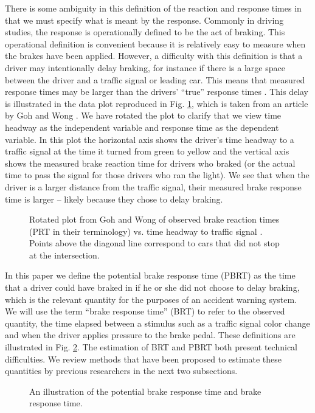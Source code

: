 \documentclass[conference]{IEEEtran}
\begin{document}
There is some ambiguity in this definition of the reaction and response times in that we must specify what is meant by the response.  Commonly in driving studies, the response is operationally defined to be the act of braking.
 This operational definition is convenient because it is relatively easy to measure when the brakes have been applied.  However, a difficulty with this definition is that a driver may intentionally delay braking, for instance if there is a large space between the driver and a traffic signal or leading car.  This means that measured response times may be larger than the drivers' ``true'' response times \cite{GohWong:DriverPRTDuringSignalChange}.
This delay is illustrated in the data plot reproduced in Fig. \ref{fig:GohWongRTPlot}, which is taken from an article by Goh and Wong \cite{GohWong:DriverPRTDuringSignalChange}.  We have rotated the plot to clarify that we view time headway as the independent variable and response time as the dependent variable.  In this plot the horizontal axis shows the driver's time headway to a traffic signal at the time it turned from green to yellow and the vertical axis shows the measured brake reaction time for drivers who braked (or the actual time to pass the signal for those drivers who ran the light).  We see that when the driver is a larger distance from the traffic signal, their measured brake response time is larger -- likely because they chose to delay braking.
\begin{figure}[!t]
\centering
{}
\caption{Rotated plot from Goh and Wong of observed brake reaction times (PRT in their terminology) vs. time headway to traffic signal \cite{GohWong:DriverPRTDuringSignalChange}.  Points above the diagonal line correspond to cars that did not stop at the intersection.}
\label{fig:GohWongRTPlot}
\end{figure}

In this paper we define the potential brake response time (PBRT) as the time that a driver could have braked in if he or she did not choose to delay braking, which is the relevant quantity for the purposes of an accident warning system.  We will use the term ``brake response time'' (BRT) to refer to the observed quantity, the time elapsed between a stimulus such as a traffic signal color change and when the driver applies pressure to the brake pedal.  These definitions are illustrated in Fig. \ref{fig:OurPRTIllustration}.  The estimation of BRT and PBRT both present technical difficulties.  We review methods that have been proposed to estimate these quantities by previous researchers in the next two subsections.
\begin{figure}[!t]
	\centering
{}
	\caption{An illustration of the potential brake response time and brake response time.}
	\label{fig:OurPRTIllustration}
\end{figure}
\end{document}

